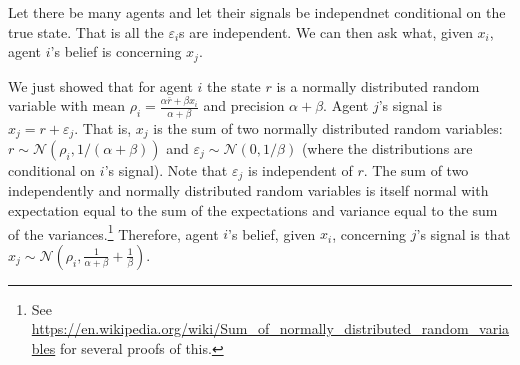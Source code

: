 \documentclass[12pt,english,a4paper]{article}
\theoremstyle{plain}
\begin{document}
Let there be many agents and let their signals be independnet conditional on the true state. That is all the $\varepsilon_i$s are independent. We can then ask what, given $x_i$, agent $i$'s belief is concerning $x_j$.

We just showed that for agent $i$ the state $r$ is a normally distributed random variable with mean $\rho_i=\frac{\alpha\bar{r}+\beta x_i}{\alpha+\beta}$ and precision $\alpha+\beta$. Agent $j$'s signal is $x_j=r+\varepsilon _j$. That is, $x_j$ is the sum of two normally distributed random variables: $r\sim\mathcal{N}(\rho_i,1/(\alpha+\beta))$ and $\varepsilon _j\sim\mathcal{N}(0,1/\beta)$ (where the distributions are conditional on $i$'s signal). Note that $\varepsilon _j$ is independent of $r$. The sum of two independently and normally distributed random variables is itself normal with expectation equal to the sum of the expectations and variance equal to the sum of the variances.\footnote{See \url{https://en.wikipedia.org/wiki/Sum_of_normally_distributed_random_variables} for several proofs of this.} Therefore, agent $i$'s belief, given $x_i$, concerning $j$'s signal is that $x_j\sim\mathcal{N}(\rho_i,\frac{1}{\alpha+\beta}+\frac{1}{\beta})$.
\end{document}
